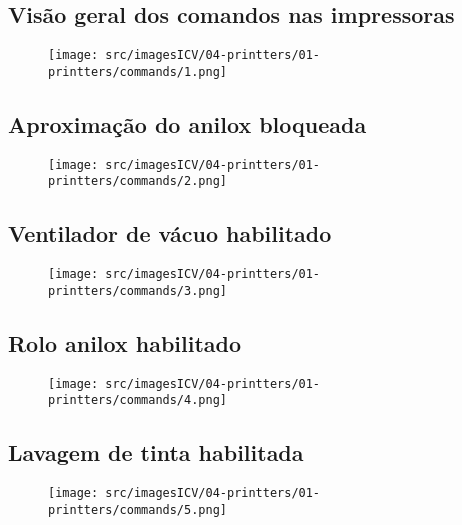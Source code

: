 \thispagestyle{fancy}
\vspace{\fill}
\subsection{Visão geral dos comandos nas impressoras}
\begin{figure}
    \centering
    \texttt{[image: src/imagesICV/04-printters/01-printters/commands/1.png]}
\end{figure}

\newpage
\thispagestyle{fancy}
\vspace{\fill}
\subsection{Aproximação do anilox bloqueada}
\begin{figure}
    \centering
    \texttt{[image: src/imagesICV/04-printters/01-printters/commands/2.png]}
\end{figure}

\newpage
\thispagestyle{fancy}
\vspace{\fill}
\subsection{Ventilador de vácuo habilitado}
\begin{figure}
    \centering
    \texttt{[image: src/imagesICV/04-printters/01-printters/commands/3.png]}
\end{figure}

\newpage
\thispagestyle{fancy}
\vspace{\fill}
\subsection{Rolo anilox habilitado}
\begin{figure}
    \centering
    \texttt{[image: src/imagesICV/04-printters/01-printters/commands/4.png]}
\end{figure}

\newpage
\thispagestyle{fancy}
\vspace{\fill}
\subsection{Lavagem de tinta habilitada}
\begin{figure}
    \centering
    \texttt{[image: src/imagesICV/04-printters/01-printters/commands/5.png]}
\end{figure}

